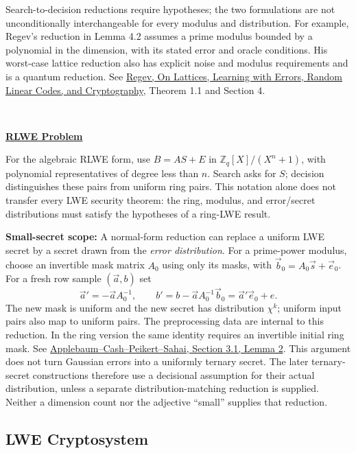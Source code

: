 \begin{tcolorbox}[title={\textbf{\tboxlabel{\ref*{subsec:lattice-overview}} The LWE (Learning with Errors) and RLWE Problems}}]
Search-to-decision reductions require hypotheses; the two formulations are not unconditionally interchangeable for every modulus and distribution. For example, Regev's reduction in Lemma 4.2 assumes a prime modulus bounded by a polynomial in the dimension, with its stated error and oracle conditions. His worst-case lattice reduction also has explicit noise and modulus requirements and is a quantum reduction. See \href{https://cims.nyu.edu/~regev/papers/qcrypto.pdf}{Regev, On Lattices, Learning with Errors, Random Linear Codes, and Cryptography}, Theorem 1.1 and Section 4.

$ $

\textbf{\underline{RLWE Problem}}

For the algebraic RLWE form, use $B=AS+E$ in $\mathbb Z_q[X]/(X^n+1)$, with polynomial representatives of degree less than $n$. Search asks for $S$; decision distinguishes these pairs from uniform ring pairs. This notation alone does not transfer every LWE security theorem: the ring, modulus, and error/secret distributions must satisfy the hypotheses of a ring-LWE result.

\end{tcolorbox}




\noindent\textbf{Small-secret scope:} A normal-form reduction can replace a uniform LWE secret by a secret drawn from the \emph{error distribution}. For a prime-power modulus, choose an invertible mask matrix $A_0$ using only its masks, with $\vec b_0=A_0\vec s+\vec e_0$. For a fresh row sample $(\vec a,b)$ set
\[
\vec a'=-\vec aA_0^{-1},\qquad b'=b-\vec aA_0^{-1}\vec b_0
=\vec a'\vec e_0+e.
\]
The new mask is uniform and the new secret has distribution $\chi^k$; uniform input pairs also map to uniform pairs. The preprocessing data are internal to this reduction. In the ring version the same identity requires an invertible initial ring mask. See \href{https://web.cs.ucla.edu/~sahai/work/web/2009\%20Publications/ACPS09.pdf}{Applebaum--Cash--Peikert--Sahai, Section 3.1, Lemma 2}. This argument does not turn Gaussian errors into a uniformly ternary secret. The later ternary-secret constructions therefore use a decisional assumption for their actual distribution, unless a separate distribution-matching reduction is supplied. Neither a dimension count nor the adjective ``small'' supplies that reduction.

\subsection{LWE Cryptosystem}
\label{subsec:lattice-scheme}

